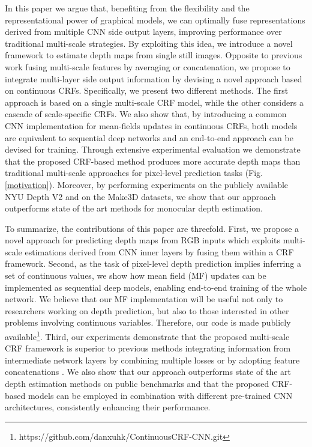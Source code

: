 \documentclass[10pt,twocolumn,letterpaper]{article}
\begin{document}
In this paper we argue that, benefiting from the flexibility and the representational power of graphical models, we
can optimally fuse representations derived from multiple CNN side output layers, improving
performance over traditional multi-scale strategies.
By exploiting this idea, we introduce a novel framework
to estimate depth maps from single still images. 
{Opposite to previous work fusing multi-scale features by averaging or concatenation, we propose to integrate 
multi-layer side output information by devising a novel approach based on continuous CRFs.}
Specifically, we present two different methods. The first approach is based on 
a single multi-scale CRF model, while the other considers a cascade of scale-specific CRFs. We also show that, by introducing a common CNN implementation for mean-fields updates in continuous CRFs, both models are equivalent to 
sequential deep networks and an end-to-end approach can be devised for training. 
Through extensive experimental evaluation
we demonstrate that the proposed CRF-based method produces more accurate depth maps than
traditional multi-scale approaches for pixel-level prediction tasks \cite{hariharan2015hypercolumns,xie2015holistically} (Fig.\ref{motivation}). Moreover,
by performing experiments on the publicly available NYU Depth V2 \cite{silberman2012indoor} and on the 
Make3D \cite{saxena2009make3d} datasets, we show that our approach outperforms state of the art methods for monocular depth estimation.

To summarize, the contributions of this paper are threefold. First, we propose a novel approach for predicting depth maps from RGB inputs
which exploits multi-scale estimations derived from CNN inner layers by fusing them within a CRF framework. 
Second, as the task of
pixel-level depth prediction implies inferring a set of continuous values, we show how
mean field (MF) updates can be implemented as sequential deep models, enabling end-to-end training of the whole network. We
believe that our MF implementation will be useful not only to researchers working on depth prediction, but also to
those interested in other problems involving continuous variables. Therefore, our code is made publicly available\footnote{https://github.com/danxuhk/ContinuousCRF-CNN.git}.
Third, our experiments demonstrate that
the proposed multi-scale CRF framework is superior to previous methods integrating information from intermediate network layers by combining multiple
losses \cite{xie2015holistically} or by adopting feature 
concatenations \cite{hariharan2015hypercolumns}. We also show that our approach outperforms state of the art depth estimation methods on 
public benchmarks and that
the proposed CRF-based models can be employed in combination with different pre-trained CNN architectures, consistently enhancing their performance. 
\end{document}
